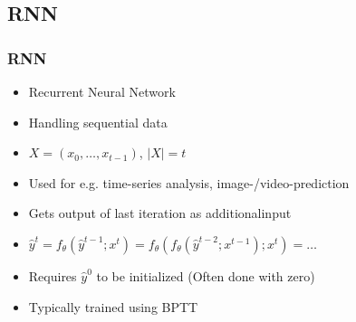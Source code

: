  \subsection{RNN}
  \begin{frame}
   \frametitle{RNN}
   
   \begin{itemize}
    \item<1-> Recurrent Neural Network
    \item<2-> Handling sequential data
    \item<3-> $X = (x_0, \ldots, x_{t-1})$, $|X| = t$
    \item<4-> Used for e.g. time-series analysis, image-/video-prediction
    \item<5-> Gets output of last iteration as \glqq additional\grqq input
    \item<6-> $\hat{y}^t = f_{\theta}(\hat{y}^{t-1};x^t) = f_{\theta}(f_{\theta}(\hat{y}^{t-2};x^{t-1});x^t) = \ldots$
    \item<7-> Requires $\hat{y}^0$ to be initialized (Often done with zero)
    \item<8-> Typically trained using BPTT
   \end{itemize}
   
  \end{frame}
  \begin{frame}
  \end{frame}
 
